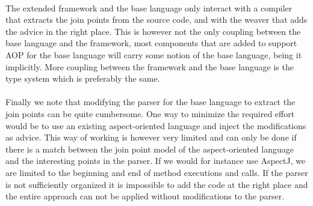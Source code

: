 \documentclass[a4paper]{report}
\begin{document}
\\
The extended framework and the base language only interact with a compiler that extracts the join points from the source code, and with the weaver that adds the advice in the right place. This is however not the only coupling between the base language and the framework, most components that are added to support AOP for the base language will carry some notion of the base language, being it implicitly. More coupling between the framework and the base language is the type system which is preferably the same.\\
\\
Finally we note that modifying the parser for the base language to extract the join points can be quite cumbersome. One way to minimize the required effort would be to use an existing aspect-oriented language and inject the modifications as advice. This way of working is however very limited and can only be done if there is a match between the join point model of the aspect-oriented language and the interesting points in the parser. If we would for instance use AspectJ, we are limited to the beginning and end of method executions and calls. If the parser is not sufficiently organized it is impossible to add the code at the right place and the entire approach can not be applied without modifications to the parser.
\end{document}
